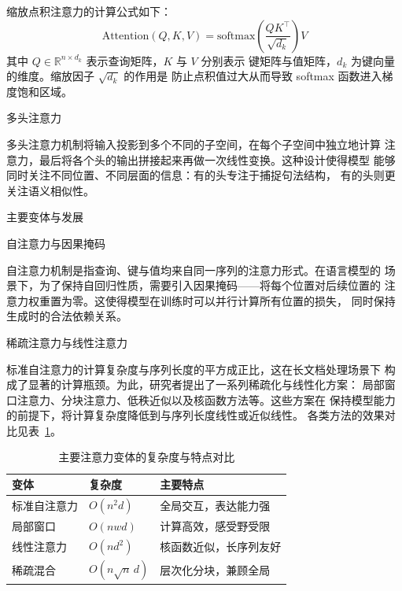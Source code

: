 \documentclass[12pt]{article}
\begin{document}
缩放点积注意力的计算公式如下：
\begin{equation}
\mathrm{Attention}(Q,K,V)=\mathrm{softmax}\!\left(\frac{QK^{\top}}{\sqrt{d_k}}\right)V
\end{equation}
其中 $Q\in\mathbb{R}^{n\times d_k}$ 表示查询矩阵，$K$ 与 $V$ 分别表示
键矩阵与值矩阵，$d_k$ 为键向量的维度。缩放因子 $\sqrt{d_k}$ 的作用是
防止点积值过大从而导致 softmax 函数进入梯度饱和区域。

\par\vskip 14pt{\zhhei 多头注意力\par}\vskip 8pt

多头注意力机制将输入投影到多个不同的子空间，在每个子空间中独立地计算
注意力，最后将各个头的输出拼接起来再做一次线性变换。这种设计使得模型
能够同时关注不同位置、不同层面的信息：有的头专注于捕捉句法结构，
有的头则更关注语义相似性。

\par\vskip 20pt{\zhhei 主要变体与发展\par}\vskip 10pt

\par\vskip 14pt{\zhhei 自注意力与因果掩码\par}\vskip 8pt

自注意力机制是指查询、键与值均来自同一序列的注意力形式。在语言模型的
场景下，为了保持自回归性质，需要引入因果掩码——将每个位置对后续位置的
注意力权重置为零。这使得模型在训练时可以并行计算所有位置的损失，
同时保持生成时的合法依赖关系。

\par\vskip 14pt{\zhhei 稀疏注意力与线性注意力\par}\vskip 8pt

标准自注意力的计算复杂度与序列长度的平方成正比，这在长文档处理场景下
构成了显著的计算瓶颈。为此，研究者提出了一系列稀疏化与线性化方案：
局部窗口注意力、分块注意力、低秩近似以及核函数方法等。这些方案在
保持模型能力的前提下，将计算复杂度降低到与序列长度线性或近似线性。
各类方法的效果对比见表~\ref{tab:compare}。

\begin{table}[h]
\centering
\caption{主要注意力变体的复杂度与特点对比}
\label{tab:compare}
\begin{tabular}{lll}
\hline
变体 & 复杂度 & 主要特点 \\
\hline
标准自注意力 & $O(n^2 d)$ & 全局交互，表达能力强 \\
局部窗口 & $O(nwd)$ & 计算高效，感受野受限 \\
线性注意力 & $O(nd^2)$ & 核函数近似，长序列友好 \\
稀疏混合 & $O(n\sqrt{n}\,d)$ & 层次化分块，兼顾全局 \\
\hline
\end{tabular}
\end{table}
\end{document}
